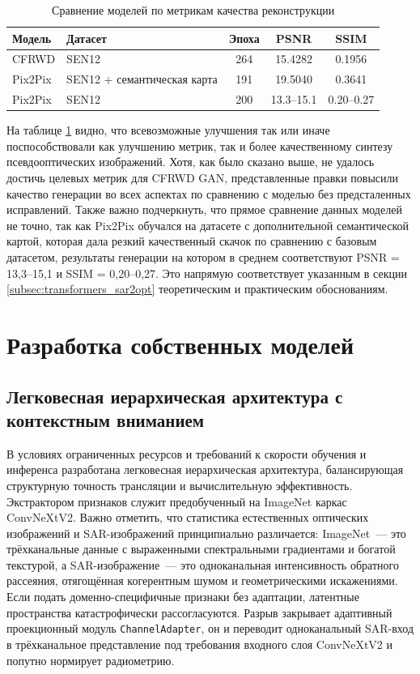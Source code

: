 \begin{table}[H]
  \caption{Сравнение моделей по метрикам качества реконструкции}
  \label{tab:model_metrics}
  \centering
  \begin{tabular}{llccc}
    \toprule
    Модель & Датасет & Эпоха & PSNR & SSIM \\
    \midrule
    CFRWD   & SEN12   & 264 & 15.4282 & 0.1956 \\
    Pix2Pix & SEN12 + семантическая карта & 191 & 19.5040 & 0.3641   \\
    Pix2Pix & SEN12   & 200 & 13.3–15.1 & 0.20–0.27 \\
    \bottomrule
  \end{tabular}
\end{table}

На таблице \ref{tab:model_metrics} видно, что всевозможные улучшения так или иначе поспособствовали как улучшению метрик, так и более качественному синтезу псевдооптических изображений.
Хотя, как было сказано выше, не удалось достичь целевых метрик для CFRWD GAN, представленные правки повысили качество генерации во всех аспектах по сравнению с моделью без предсталенных исправлений.
Также важно подчеркнуть, что прямое сравнение данных моделей не точно, так как Pix2Pix обучался на датасете с дополнительной семантической картой, которая дала резкий качественный скачок по сравнению с базовым датасетом, результаты генерации на котором в среднем соответствуют PSNR = 13,3–15,1 и SSIM = 0,20–0,27.
Это напрямую соответствует указанным в секции \ref{subsec:transformers_sar2opt} теоретическим и практическим обоснованиям.

\section{Разработка собственных моделей}

\subsection{Легковесная иерархическая архитектура с контекстным вниманием}
\label{subsec:lightweight_hierarchical_model}

В условиях ограниченных ресурсов и требований к скорости обучения и инференса разработана легковесная иерархическая архитектура, балансирующая структурную точность трансляции и вычислительную эффективность.
Экстрактором признаков служит предобученный на ImageNet каркас ConvNeXtV2.
Важно отметить, что статистика естественных оптических изображений и SAR-изображений принципиально различается: ImageNet~--- это трёхканальные данные с выраженными спектральными градиентами и богатой текстурой, а SAR-изображение~--- это одноканальная интенсивность обратного рассеяния, отягощённая когерентным шумом и геометрическими искажениями.
Если подать доменно-специфичные признаки без адаптации, латентные пространства катастрофически рассогласуются.
Разрыв закрывает адаптивный проекционный модуль \texttt{ChannelAdapter}, он и переводит одноканальный SAR-вход в трёхканальное представление под требования входного слоя ConvNeXtV2 и попутно нормирует радиометрию.

